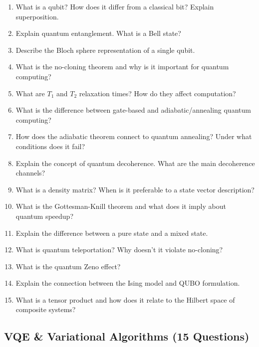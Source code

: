 \documentclass[11pt,a4paper]{article}
\begin{document}
\begin{questionbox}
\begin{enumerate}[label=\textbf{Q\arabic*.}]
    \item What is a qubit? How does it differ from a classical bit? Explain superposition.
    \item Explain quantum entanglement. What is a Bell state?
    \item Describe the Bloch sphere representation of a single qubit.
    \item What is the no-cloning theorem and why is it important for quantum computing?
    \item What are $T_1$ and $T_2$ relaxation times? How do they affect computation?
    \item What is the difference between gate-based and adiabatic/annealing quantum computing?
    \item How does the adiabatic theorem connect to quantum annealing? Under what conditions does it fail?
    \item Explain the concept of quantum decoherence. What are the main decoherence channels?
    \item What is a density matrix? When is it preferable to a state vector description?
    \item What is the Gottesman-Knill theorem and what does it imply about quantum speedup?
    \item Explain the difference between a pure state and a mixed state.
    \item What is quantum teleportation? Why doesn't it violate no-cloning?
    \item What is the quantum Zeno effect?
    \item Explain the connection between the Ising model and QUBO formulation.
    \item What is a tensor product and how does it relate to the Hilbert space of composite systems?
\end{enumerate}
\end{questionbox}

\subsection{VQE \& Variational Algorithms (15 Questions)}
\end{document}
